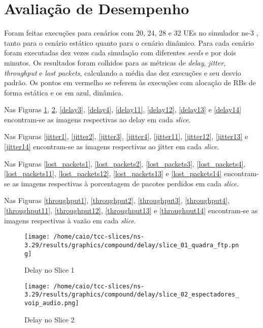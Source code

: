 \documentclass[11pt,twoside]{article}
\begin{document}
\section{Avaliação de Desempenho}

	Foram feitas execuções para cenários com 20, 24, 28 e 32 UEs no simulador ns-3 \cite{ns3}, tanto para o cenário estático quanto para o cenário dinâmico. Para cada cenário foram executadas dez vezes cada simulação com diferentes \textit{seeds} e por dois minutos. Os resultados foram colhidos para as métricas de \textit{delay}, \textit{jitter}, \textit{throughput} e \textit{lost packets}, calculando a média das dez execuções e seu desvio padrão. Os pontos em vermelho se referem às execuções com alocação de RBs de forma estática e os em azul, dinâmica.
	
	Nas Figuras \ref{delay1}, \ref{delay2}, \ref{delay3}, \ref{delay4}, \ref{delay11}, \ref{delay12}, \ref{delay13} e \ref{delay14} encontram-se as imagens respectivas ao delay em cada \textit{slice}.
	
	Nas Figuras \ref{jitter1}, \ref{jitter2}, \ref{jitter3}, \ref{jitter4}, \ref{jitter11}, \ref{jitter12}, \ref{jitter13} e \ref{jitter14} encontram-se as imagens respectivas ao jitter em cada \textit{slice}.   
	
	Nas Figuras \ref{lost_packets1}, \ref{lost_packets2}, \ref{lost_packets3}, \ref{lost_packets4}, \ref{lost_packets11}, \ref{lost_packets12}, \ref{lost_packets13} e \ref{lost_packets14} encontram-se as imagens respectivas à porcentagem de pacotes perdidos em cada \textit{slice}.
	
	Nas Figuras \ref{throughput1}, \ref{throughput2}, \ref{throughput3}, \ref{throughput4}, \ref{throughput11}, \ref{throughput12}, \ref{throughput13} e \ref{throughput14} encontram-se as imagens respectivas à vazão em cada \textit{slice}.

	\begin{figure}[H]
		\centering
		\texttt{[image: /home/caio/tcc-slices/ns-3.29/results/graphics/compound/delay/slice\_01\_quadra\_ftp.png]}
		\caption{Delay no Slice 1}
		\label{delay1}
	\end{figure}
	
	\begin{figure}[H]
		\centering
		\texttt{[image: /home/caio/tcc-slices/ns-3.29/results/graphics/compound/delay/slice\_02\_espectadores\_voip\_audio.png]}
		\caption{Delay no Slice 2}
		\label{delay2}
	\end{figure}
	
\end{document}
